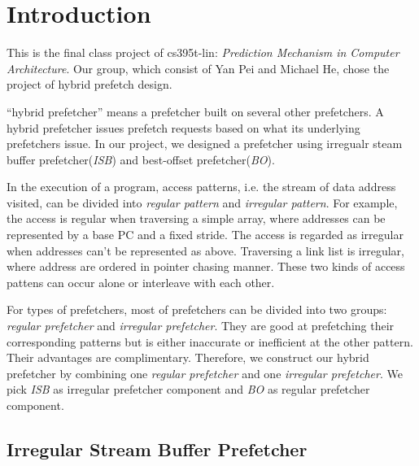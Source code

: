 \section{Introduction}
\label{sec:intro}

This is the final class project of cs395t-lin: \emph{Prediction Mechanism in Computer Architecture}. Our group, which consist of Yan Pei and Michael He, chose the project of hybrid prefetch design.

``hybrid prefetcher'' means a prefetcher built on several other prefetchers. A hybrid prefetcher issues prefetch requests based on what its underlying prefetchers issue. In our project, we designed a prefetcher using irregualr steam buffer prefetcher(\emph{ISB})\cite{isbpaper} and best-offset prefetcher(\emph{BO})\cite{bopaper}.

In the execution of a program, access patterns, i.e. the stream of data address visited, can be divided into \emph{regular pattern} and \emph{irregular pattern}. For example, the access is regular when traversing a simple array, where addresses can be represented by a base PC and a fixed stride. The access is regarded as irregular when addresses can't be represented as above.  Traversing a link list is irregular, where address are ordered in pointer chasing manner. These two kinds of access pattens can occur alone or interleave with each other.

For types of prefetchers, most of prefetchers can be divided into two groups: \emph{regular prefetcher}\cite{bopaper, sandboxpaper} and \emph{irregular prefetcher}\cite{isbpaper, ghbpaper, reinforcementlearning}. 
They are good at prefetching their corresponding patterns but is either inaccurate or inefficient at the other pattern. Their advantages are complimentary. 
Therefore, we construct our hybrid prefetcher by combining one \emph{regular prefetcher} and one \emph{irregular prefetcher}. 
We pick \emph{ISB}\cite{isbpaper} as irregular prefetcher component and \emph{BO}\cite{bopaper} as regular prefetcher component.

  \subsection{Irregular Stream Buffer Prefetcher}
  \label{sec:isbintro}

